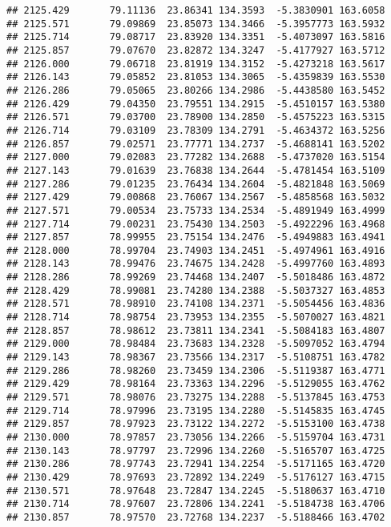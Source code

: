 \documentclass[
]{article}
\begin{document}
\begin{verbatim}
## 2125.429       79.11136  23.86341 134.3593  -5.3830901 163.6058
## 2125.571       79.09869  23.85073 134.3466  -5.3957773 163.5932
## 2125.714       79.08717  23.83920 134.3351  -5.4073097 163.5816
## 2125.857       79.07670  23.82872 134.3247  -5.4177927 163.5712
## 2126.000       79.06718  23.81919 134.3152  -5.4273218 163.5617
## 2126.143       79.05852  23.81053 134.3065  -5.4359839 163.5530
## 2126.286       79.05065  23.80266 134.2986  -5.4438580 163.5452
## 2126.429       79.04350  23.79551 134.2915  -5.4510157 163.5380
## 2126.571       79.03700  23.78900 134.2850  -5.4575223 163.5315
## 2126.714       79.03109  23.78309 134.2791  -5.4634372 163.5256
## 2126.857       79.02571  23.77771 134.2737  -5.4688141 163.5202
## 2127.000       79.02083  23.77282 134.2688  -5.4737020 163.5154
## 2127.143       79.01639  23.76838 134.2644  -5.4781454 163.5109
## 2127.286       79.01235  23.76434 134.2604  -5.4821848 163.5069
## 2127.429       79.00868  23.76067 134.2567  -5.4858568 163.5032
## 2127.571       79.00534  23.75733 134.2534  -5.4891949 163.4999
## 2127.714       79.00231  23.75430 134.2503  -5.4922296 163.4968
## 2127.857       78.99955  23.75154 134.2476  -5.4949883 163.4941
## 2128.000       78.99704  23.74903 134.2451  -5.4974961 163.4916
## 2128.143       78.99476  23.74675 134.2428  -5.4997760 163.4893
## 2128.286       78.99269  23.74468 134.2407  -5.5018486 163.4872
## 2128.429       78.99081  23.74280 134.2388  -5.5037327 163.4853
## 2128.571       78.98910  23.74108 134.2371  -5.5054456 163.4836
## 2128.714       78.98754  23.73953 134.2355  -5.5070027 163.4821
## 2128.857       78.98612  23.73811 134.2341  -5.5084183 163.4807
## 2129.000       78.98484  23.73683 134.2328  -5.5097052 163.4794
## 2129.143       78.98367  23.73566 134.2317  -5.5108751 163.4782
## 2129.286       78.98260  23.73459 134.2306  -5.5119387 163.4771
## 2129.429       78.98164  23.73363 134.2296  -5.5129055 163.4762
## 2129.571       78.98076  23.73275 134.2288  -5.5137845 163.4753
## 2129.714       78.97996  23.73195 134.2280  -5.5145835 163.4745
## 2129.857       78.97923  23.73122 134.2272  -5.5153100 163.4738
## 2130.000       78.97857  23.73056 134.2266  -5.5159704 163.4731
## 2130.143       78.97797  23.72996 134.2260  -5.5165707 163.4725
## 2130.286       78.97743  23.72941 134.2254  -5.5171165 163.4720
## 2130.429       78.97693  23.72892 134.2249  -5.5176127 163.4715
## 2130.571       78.97648  23.72847 134.2245  -5.5180637 163.4710
## 2130.714       78.97607  23.72806 134.2241  -5.5184738 163.4706
## 2130.857       78.97570  23.72768 134.2237  -5.5188466 163.4702

\end{verbatim}
\end{document}

